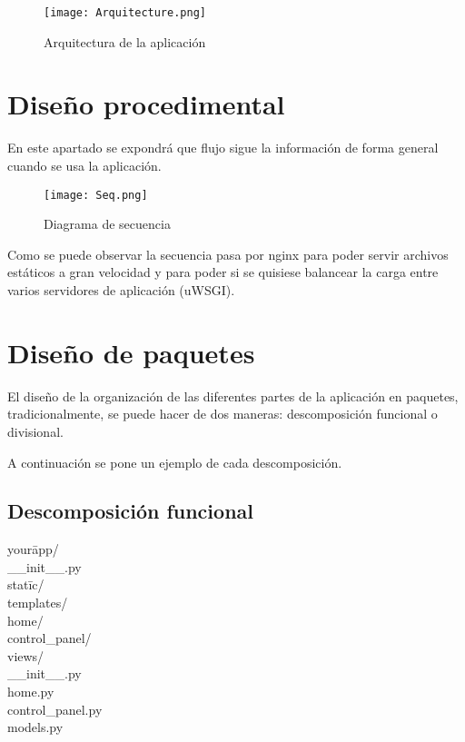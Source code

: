 \begin{figure}
	\centering
	\texttt{[image: Arquitecture.png]}
	\caption{Arquitectura de la aplicación}\label{fig:Arquitecture.png}
\end{figure}


\section{Diseño procedimental}
En este apartado se expondrá que flujo sigue la información de forma general cuando se usa la aplicación.


\begin{figure}
	\centering
	\texttt{[image: Seq.png]}
	\caption{Diagrama de secuencia}\label{fig:Seq.png}
\end{figure}

Como se puede observar la secuencia pasa por nginx para poder servir archivos estáticos a gran velocidad y para poder si se quisiese balancear la carga entre varios servidores de aplicación (uWSGI).


\section{Diseño de paquetes}
El diseño de la organización de las diferentes partes de la aplicación en paquetes, tradicionalmente, se puede hacer de dos maneras: descomposición funcional o divisional.

A continuación se pone un ejemplo de cada descomposición. 

\subsection{Descomposición funcional}

\begin{tabbing}
your\= app/ \\
\> \_\_init\_\_.py \\
\> stat\= ic/ \\
\> templates/ \\
\> \> home/ \\
\> \> control\_panel/ \\
\> views/ \\
\>\>\_\_init\_\_.py \\
\> \> home.py \\
\> \> control\_panel.py \\
\> models.py \\
\end{tabbing}


